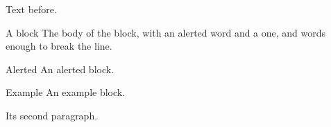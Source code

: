 \documentclass{beamer}
\begin{document}
\begin{frame}
Text before.
\begin{block}{A block}
The body of the block, with an \alert{alerted} word and a  one, and words enough to break the line.
\end{block}
\begin{alertblock}{Alerted}
An alerted block.
\end{alertblock}
\begin{exampleblock}{Example}
An example block.

Its second paragraph.
\end{exampleblock}
\end{frame}
\end{document}
